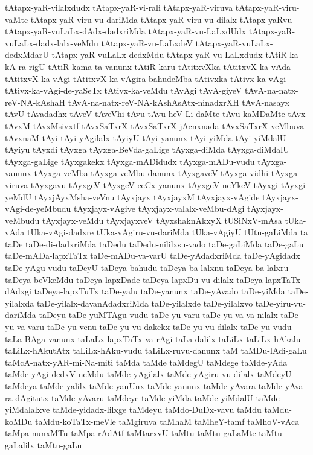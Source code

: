 {tAtapx-yaR-vilalxdudx
tAtapx-yaR-vi-rali
tAtapx-yaR-viruva
tAtapx-yaR-viru-vaMte
tAtapx-yaR-viru-vu-dariMda
tAtapx-yaR-viru-vu-dilalx
tAtapx-yaRvu
tAtapx-yaR-vuLaLx-dAdx-dadxriMda
tAtapx-yaR-vu-LaLxdUdx
tAtapx-yaR-vuLaLx-dadx-lalx-veMdu
tAtapx-yaR-vu-LaLxdeV
tAtapx-yaR-vuLaLx-dedxMdarU
tAtapx-yaR-vuLaLx-dedxMdu
tAtapx-yaR-vu-LaLxdudx
tAtiR-ka-kA-ra-rigU
tAtiR-kama-ta-vanunx
tAtiR-karu
tAtitxvXka
tAtitxvX-ka-vAda
tAtitxvX-ka-vAgi
tAtitxvX-ka-vAgira-bahudeMba
tAtivxka
tAtivx-ka-vAgi
tAtivx-ka-vAgi-de-yaSeTx
tAtivx-ka-veMdu
tAvAgi
tAvA-giyeV
tAvA-na-natx-reV-NA-kAshaH
tAvA-na-natx-reV-NA-kAshAsAtx-ninadxrXH
tAvA-nasayx
tAvU
tAvadadhx
tAveV
tAveVhi
tAvu
tAvu-heV-Li-daMte
tAvu-kaMDaMte
tAvx
tAvxM
tAvxMsivxtf
tAvxSaTxrX
tAvxSaTxrX-jAcnxnada
tAvxSaTxrX-veMbuva
tAvxnaM
tAyi
tAyi-yAgilalx
tAyiyU
tAyi-yanunx
tAyi-yiMda
tAyi-yiMdalU
tAyiyu
tAyxdi
tAyxga
tAyxga-BeVda-gaLige
tAyxga-diMda
tAyxga-diMdalU
tAyxga-gaLige
tAyxgakekx
tAyxga-mADidudx
tAyxga-mADu-vudu
tAyxga-vanunx
tAyxga-veMba
tAyxga-veMbu-danunx
tAyxgaveV
tAyxga-vidhi
tAyxga-viruva
tAyxgavu
tAyxgeV
tAyxgeV-ceCx-yanunx
tAyxgeV-neYkeV
tAyxgi
tAyxgi-yeMdU
tAyxjAyxMsha-veVnu
tAyxjayx
tAyxjayxM
tAyxjayx-vAgide
tAyxjayx-vAgi-de-yeMbudu
tAyxjayx-vAgive
tAyxjayx-valalx-veMbu-dAgi
tAyxjayx-veMbudu
tAyxjayx-veMdu
tAyxjayxveV
tAyxshaknAkxyX
tUSiNxV-mAsa
tUka-vAda
tUka-vAgi-dadxre
tUka-vAgiru-vu-dariMda
tUka-vAgiyU
tUtu-gaLiMda
ta
taDe
taDe-di-dadxriMda
taDedu
taDedu-nililxsu-vado
taDe-gaLiMda
taDe-gaLu
taDe-mADa-lapxTaTx
taDe-mADu-va-varU
taDe-yAdadxriMda
taDe-yAgidadx
taDe-yAgu-vudu
taDeyU
taDeya-bahudu
taDeya-ba-lalxnu
taDeya-ba-lalxru
taDeya-beVkeMdu
taDeya-lapxDade
taDeya-lapxDu-vu-dilalx
taDeya-lapxTaTx-dAdxgi
taDeya-lapxTuTx
taDe-yalu
taDe-yanunx
taDe-yAvado
taDe-yiMda
taDe-yilalxda
taDe-yilalx-davanAdadxriMda
taDe-yilalxde
taDe-yilalxvo
taDe-yiru-vu-dariMda
taDeyu
taDe-yuMTAgu-vudu
taDe-yu-varu
taDe-yu-va-va-nilalx
taDe-yu-va-varu
taDe-yu-venu
taDe-yu-vu-dakekx
taDe-yu-vu-dilalx
taDe-yu-vudu
taLa-BAga-vanunx
taLaLx-lapxTaTx-va-rAgi
taLa-dalilx
taLiLx
taLiLx-hAkalu
taLiLx-hAkutAtx
taLiLx-hAku-vudu
taLiLx-ruvu-danunx
taM
taMDu-lAdi-gaLu
taMcA-natx-yAR-mi-Na-miti
taMda
taMde
taMdegU
taMdege
taMde-yAda
taMde-yAgi-dedxV-neMdu
taMde-yAgilalx
taMde-yAgiru-vu-dilalx
taMdeyU
taMdeya
taMde-yalilx
taMde-yanUnx
taMde-yanunx
taMde-yAvara
taMde-yAva-ra-dAgitutx
taMde-yAvaru
taMdeye
taMde-yiMda
taMde-yiMdalU
taMde-yiMdalalxve
taMde-yidadx-lilxge
taMdeyu
taMdo-DuDx-vavu
taMdu
taMdu-koMDu
taMdu-koTaTx-meVle
taMgiruva
taMhaM
taMheY-tamf
taMhoV-vAca
taMpa-nunxMTu
taMpa-rAdAtf
taMtarxvU
taMtu
taMtu-gaLaMte
taMtu-gaLalilx
taMtu-gaLu
}
